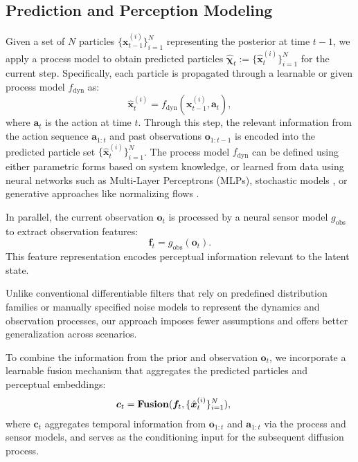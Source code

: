 \subsection{Prediction and Perception Modeling}
Given a set of $N$ particles $\{\bm{x}_{t-1}^{(i)}\}_{i=1}^N$ representing the posterior at time $t{-}1$, we apply a process model to obtain predicted particles ${\hat{\bm{\chi}}_{t}}:=\{\hat{\bm{x}}_t^{(i)}\}_{i=1}^N$ for the current step. Specifically, each particle is propagated through a learnable or given process model $f_{\text{dyn}}$ as:
\begin{equation}
\hat{\bm{x}}_t^{(i)} = f_{\text{dyn}}(\bm{x}_{t-1}^{(i)}, \bm{a}_t),
\end{equation}
where $\bm{a}_t$ is the action at time $t$. Through this step, the relevant information from the action sequence $\bm{a}_{1:t}$ and past observations $\bm{o}_{1:t-1}$ is encoded into the predicted particle set $\{\hat{\bm{x}}_t^{(i)}\}_{i=1}^N$.
The process model $f_{\text{dyn}}$ can be defined using either parametric forms based on system knowledge, or learned from data using neural networks such as Multi-Layer Perceptrons (MLPs), stochastic models \cite{jospin2022hands}, or generative approaches like normalizing flows \cite{papamakarios2021normalizing}.

In parallel, the current observation $\bm{o}_t$ is processed by a neural sensor model $g_{\text{obs}}$ to extract observation features:
\begin{equation}
\bm{f}_t = g_{\text{obs}}(\bm{o}_t).
\end{equation}
This feature representation encodes perceptual information relevant to the latent state.

Unlike conventional differentiable filters that rely on predefined distribution families or manually specified noise models to represent the dynamics and observation processes, our approach imposes fewer assumptions and offers better generalization across scenarios.

To combine the information from the prior and observation $\bm{o}_t$, we incorporate a learnable fusion mechanism that aggregates the predicted particles and perceptual embeddings:
\begin{equation} 
    \begin{aligned}
          {\bm c}_{t} & =  {\bf Fusion} ({\bm f}_{t}, \{\hat{\bm{x}}_t^{(i)}\}_{i=1}^N),\ 
    \end{aligned}
\end{equation}
where $\bm{c}_t$ aggregates temporal information from $\bm{o}_{1:t}$ and $\bm{a}_{1:t}$ via the process and sensor models, and serves as the conditioning input for the subsequent diffusion process.

